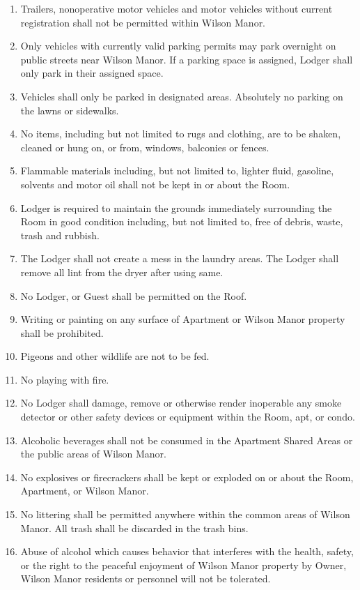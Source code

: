 \documentclass[12pt,letterpaper]{article}
\newcommand{\condo}{Wilson Manor}
\newcommand{\apt}{Apartment}
\newcommand{\room}{Room}
\newcommand{\shared}{Apartment Shared Areas}
\newcommand{\lodger}{Lodger}
\begin{document}
\begin{enumerate}
	\item Trailers, nonoperative motor vehicles and motor vehicles without current registration shall not be permitted within \condo{}. 
	\item Only vehicles with currently valid parking permits may park overnight on public streets near \condo{}. If a parking space is assigned, \lodger{} shall only park in their assigned space. 
	\item Vehicles shall only be parked in designated areas. Absolutely no parking on the lawns or sidewalks. 
	\item No items, including but not limited to rugs and clothing, are to be shaken, cleaned or hung on, or from, windows, balconies or fences. 
	\item Flammable materials including, but not limited to, lighter fluid, gasoline, solvents and motor oil shall not be kept in or about the \room{}. 
	\item \lodger{} is required to maintain the grounds immediately surrounding the \room{} in good condition including, but not limited to, free of debris, waste, trash and rubbish. 
	\item The \lodger{} shall not create a mess in the laundry areas. The \lodger{} shall remove all lint from the dryer after using same. 
	\item	No \lodger{}, or Guest shall be permitted on the Roof. 
	\item Writing or painting on any surface of \apt{} or \condo{} property shall be prohibited. 
	\item Pigeons and other wildlife are not to be fed. 
	\item No playing with fire. 
	\item No \lodger{} shall damage, remove or otherwise render inoperable any smoke detector or other safety devices or equipment within the \room{}, apt{}, or condo{}. 
	\item Alcoholic beverages shall not be consumed in the \shared{} or the public areas of \condo{}. 
	\item No explosives or firecrackers shall be kept or exploded on or about the \room{}, \apt{}, or \condo{}. 
	\item No littering shall be permitted anywhere within the common areas of \condo{}. All trash shall be discarded in the trash bins. 
	\item Abuse of alcohol which causes behavior that interferes with the health, safety, or the right to the peaceful enjoyment of \condo{} property by Owner, \condo{} residents or personnel will not be tolerated. 
\end{enumerate}
\end{document}
